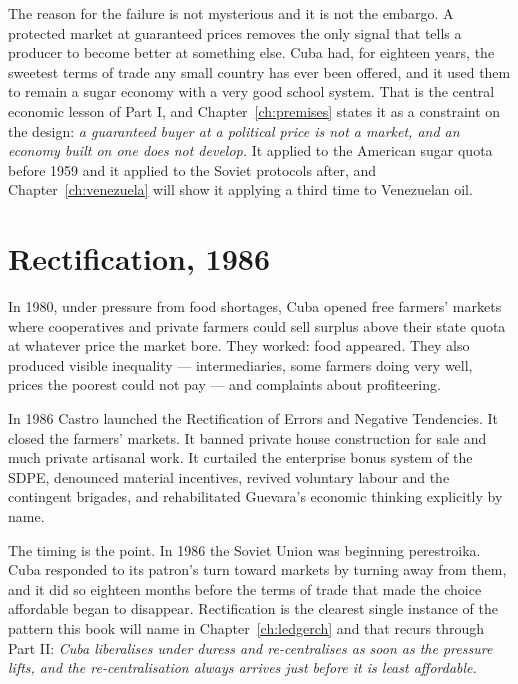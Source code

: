 The reason for the failure is not mysterious and it is not the embargo. A
protected market at guaranteed prices removes the only signal that tells a
producer to become better at something else. Cuba had, for eighteen years, the
sweetest terms of trade any small country has ever been offered, and it used
them to remain a sugar economy with a very good school system. That is the
central economic lesson of Part I, and Chapter~\ref{ch:premises} states it as a
constraint on the design: \emph{a guaranteed buyer at a political price is not
a market, and an economy built on one does not develop.} It applied to the
American sugar quota before 1959 and it applied to the Soviet protocols after,
and Chapter~\ref{ch:venezuela} will show it applying a third time to
Venezuelan oil.

\section{Rectification, 1986}

In 1980, under pressure from food shortages, Cuba opened free farmers' markets
where cooperatives and private farmers could sell surplus above their state
quota at whatever price the market bore. They worked: food appeared. They also
produced visible inequality --- intermediaries, some farmers doing very well,
prices the poorest could not pay --- and complaints about profiteering.

In 1986 Castro launched the Rectification of Errors and Negative Tendencies. It
closed the farmers' markets. It banned private house construction for sale and
much private artisanal work. It curtailed the enterprise bonus system of the
SDPE, denounced material incentives, revived voluntary labour and the
contingent brigades, and rehabilitated Guevara's economic thinking explicitly
by name.

The timing is the point. In 1986 the Soviet Union was beginning perestroika.
Cuba responded to its patron's turn toward markets by turning away from them,
and it did so eighteen months before the terms of trade that made the choice
affordable began to disappear. Rectification is the clearest single instance of
the pattern this book will name in Chapter~\ref{ch:ledgerch} and that recurs
through Part II: \emph{Cuba liberalises under duress and re-centralises as soon
as the pressure lifts, and the re-centralisation always arrives just before it
is least affordable.}

